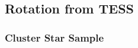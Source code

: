 \documentclass[12pt,twocolumn,tighten]{aastex63}
\begin{document}
% 



\subsection{Rotation from TESS}
\label{subsec:tess}

\subsubsection{Cluster Star Sample}
\end{document}
